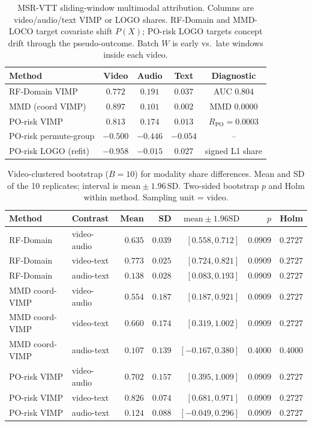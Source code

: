 
\begin{table}[ht]\centering
\caption{MSR-VTT sliding-window multimodal attribution. Columns are video/audio/text VIMP or LOGO shares. RF-Domain and MMD-LOCO target covariate shift $P(X)$; PO-risk LOGO targets concept drift through the pseudo-outcome. Batch $W$ is early vs.\ late windows inside each video.}
\label{tab:msrvtt-mm-shares}
\small
\begin{tabular}{@{}l ccc c@{}}\toprule
Method & Video & Audio & Text & Diagnostic \\
\midrule
RF-Domain VIMP & $0.772$ & $0.191$ & $0.037$ & AUC $0.804$ \\
MMD (coord VIMP) & $0.897$ & $0.101$ & $0.002$ & MMD $0.0000$ \\
PO-risk VIMP & $0.813$ & $0.174$ & $0.013$ & $R_{\mathrm{PO}}=0.0003$ \\
PO-risk permute-group & $-0.500$ & $-0.446$ & $-0.054$ & -- \\
PO-risk LOGO (refit) & $-0.958$ & $-0.015$ & $0.027$ & signed L1 share \\
\bottomrule\end{tabular}\end{table}

\begin{table}[ht]\centering
\caption{Video-clustered bootstrap ($B=10$) for modality share differences. Mean and SD of the 10 replicates; interval is $\mathrm{mean}\pm 1.96\,\mathrm{SD}$. Two-sided bootstrap $p$ and Holm within method. Sampling unit = video.}
\label{tab:msrvtt-mm-bootstrap}
\small
\begin{tabular}{@{}l l r r r r c@{}}\toprule
Method & Contrast & Mean & SD & $\mathrm{mean}\pm 1.96\mathrm{SD}$ & $p$ & Holm \\
\midrule
RF-Domain & video-audio & $0.635$ & $0.039$ & $[0.558, 0.712]$ & $0.0909$ & $0.2727$ \\
RF-Domain & video-text & $0.773$ & $0.025$ & $[0.724, 0.821]$ & $0.0909$ & $0.2727$ \\
RF-Domain & audio-text & $0.138$ & $0.028$ & $[0.083, 0.193]$ & $0.0909$ & $0.2727$ \\
MMD coord-VIMP & video-audio & $0.554$ & $0.187$ & $[0.187, 0.921]$ & $0.0909$ & $0.2727$ \\
MMD coord-VIMP & video-text & $0.660$ & $0.174$ & $[0.319, 1.002]$ & $0.0909$ & $0.2727$ \\
MMD coord-VIMP & audio-text & $0.107$ & $0.139$ & $[-0.167, 0.380]$ & $0.4000$ & $0.4000$ \\
PO-risk VIMP & video-audio & $0.702$ & $0.157$ & $[0.395, 1.009]$ & $0.0909$ & $0.2727$ \\
PO-risk VIMP & video-text & $0.826$ & $0.074$ & $[0.681, 0.971]$ & $0.0909$ & $0.2727$ \\
PO-risk VIMP & audio-text & $0.124$ & $0.088$ & $[-0.049, 0.296]$ & $0.0909$ & $0.2727$ \\
\bottomrule\end{tabular}\end{table}


